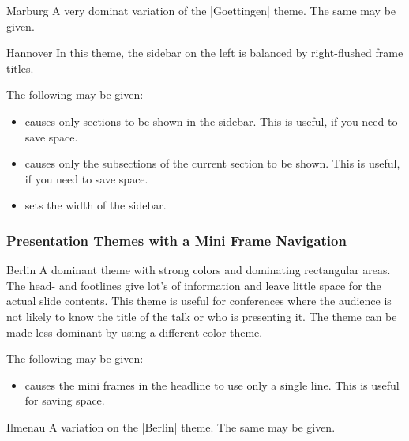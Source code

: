 \begin{themeexample}{Marburg}
  A very dominat variation of the |Goettingen| theme. The same
   may be given.
\end{themeexample}

\begin{themeexample}{Hannover}
  In this theme, the sidebar on the left is balanced by
  right-flushed frame titles.
    
  The following  may be given:
  \begin{itemize}
  \item {} causes only sections to be
    shown in the sidebar. This is useful, if you need to save
    space.
  \item {} causes only the subsections
    of the current section to be shown. This is useful, if you need to
    save  space.      
  \item {} sets the width of the
    sidebar.
  \end{itemize}
\end{themeexample}




\subsubsection{Presentation Themes with a Mini Frame Navigation}

\begin{themeexample}{Berlin}
  A dominant theme with strong colors and dominating rectangular
  areas. The head- and footlines give lot's of information and leave
  little space for the actual slide contents. This theme is useful for
  conferences where the audience is not likely to know the title of
  the talk or who is presenting it.  The theme can be made less
  dominant by using a different color theme.
  
  The following  may be given:
  \begin{itemize}
  \item {} causes the mini frames in the headline to
    use only a single line. This is useful for saving space.
  \end{itemize}
\end{themeexample}

\begin{themeexample}{Ilmenau}
  A variation on the |Berlin| theme. The same  may be
  given.  
\end{themeexample}

